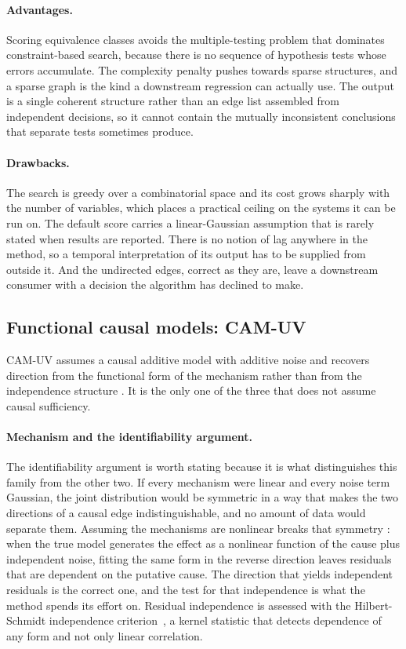 \paragraph{Advantages.} Scoring equivalence classes avoids the multiple-testing problem that dominates constraint-based search, because there is no sequence of hypothesis tests whose errors accumulate. The complexity penalty pushes towards sparse structures, and a sparse graph is the kind a downstream regression can actually use. The output is a single coherent structure rather than an edge list assembled from independent decisions, so it cannot contain the mutually inconsistent conclusions that separate tests sometimes produce.

\paragraph{Drawbacks.} The search is greedy over a combinatorial space and its cost grows sharply with the number of variables, which places a practical ceiling on the systems it can be run on. The default score carries a linear-Gaussian assumption that is rarely stated when results are reported. There is no notion of lag anywhere in the method, so a temporal interpretation of its output has to be supplied from outside it. And the undirected edges, correct as they are, leave a downstream consumer with a decision the algorithm has declined to make.

\subsection{Functional causal models: CAM-UV}
\label{sec:bg-camuv}

CAM-UV assumes a causal additive model with additive noise and recovers direction from the functional form of the mechanism rather than from the independence structure \cite{maeda2021camuv, buhlmann2014cam}. It is the only one of the three that does not assume causal sufficiency.

\paragraph{Mechanism and the identifiability argument.} The identifiability argument is worth stating because it is what distinguishes this family from the other two. If every mechanism were linear and every noise term Gaussian, the joint distribution would be symmetric in a way that makes the two directions of a causal edge indistinguishable, and no amount of data would separate them. Assuming the mechanisms are nonlinear breaks that symmetry \cite{hoyer2008anm}: when the true model generates the effect as a nonlinear function of the cause plus independent noise, fitting the same form in the reverse direction leaves residuals that are dependent on the putative cause. The direction that yields independent residuals is the correct one, and the test for that independence is what the method spends its effort on. Residual independence is assessed with the Hilbert-Schmidt independence criterion~\cite{gretton2005hsic}, a kernel statistic that detects dependence of any form and not only linear correlation.

